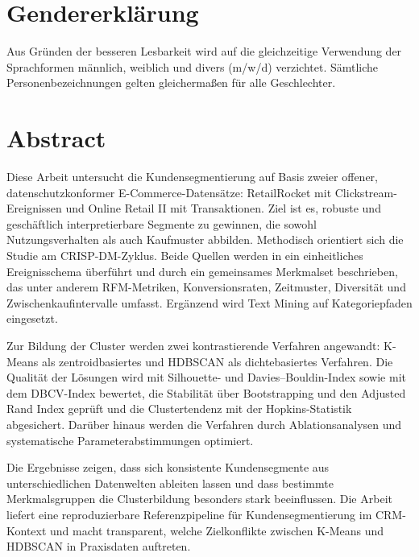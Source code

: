 \documentclass[
  11pt,
  openany, oneside]{book}
\begin{document}
\setcounter{page}{1}
\chapter*{Gendererkl\"arung}
\thispagestyle{nohead}

Aus Gr\"unden der besseren Lesbarkeit wird auf die gleichzeitige Verwendung der Sprachformen m\"annlich, weiblich und divers (m/w/d) verzichtet. S\"amtliche Personenbezeichnungen gelten gleichermaßen für alle Geschlechter.


\clearpage

\chapter*{Abstract}
\thispagestyle{nohead}

Diese Arbeit untersucht die Kundensegmentierung auf Basis zweier offener, datenschutzkonformer E-Commerce-Datensätze: RetailRocket mit Clickstream-Ereignissen und Online Retail II mit Transaktionen. Ziel ist es, robuste und geschäftlich interpretierbare Segmente zu gewinnen, die sowohl Nutzungsverhalten als auch Kaufmuster abbilden. Methodisch orientiert sich die Studie am CRISP-DM-Zyklus. Beide Quellen werden in ein einheitliches Ereignisschema überführt und durch ein gemeinsames Merkmalset beschrieben, das unter anderem RFM-Metriken, Konversionsraten, Zeitmuster, Diversität und Zwischenkaufintervalle umfasst. Ergänzend wird Text Mining auf Kategoriepfaden eingesetzt.

Zur Bildung der Cluster werden zwei kontrastierende Verfahren angewandt: K-Means als zentroidbasiertes und HDBSCAN als dichtebasiertes Verfahren. Die Qualität der Lösungen wird mit Silhouette- und Davies–Bouldin-Index sowie mit dem DBCV-Index bewertet, die Stabilität über Bootstrapping und den Adjusted Rand Index geprüft und die Clustertendenz mit der Hopkins-Statistik abgesichert. Darüber hinaus werden die Verfahren durch Ablationsanalysen und systematische Parameterabstimmungen optimiert.

Die Ergebnisse zeigen, dass sich konsistente Kundensegmente aus unterschiedlichen Datenwelten ableiten lassen und dass bestimmte Merkmalsgruppen die Clusterbildung besonders stark beeinflussen. Die Arbeit liefert eine reproduzierbare Referenzpipeline für Kundensegmentierung im CRM-Kontext und macht transparent, welche Zielkonflikte zwischen K-Means und HDBSCAN in Praxisdaten auftreten.
\end{document}
